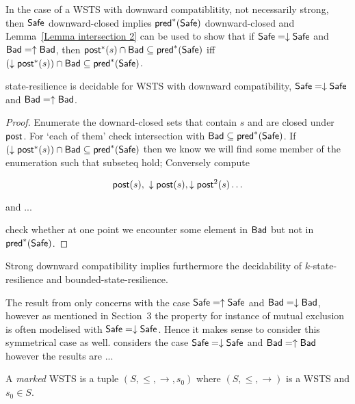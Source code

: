 In the case of a WSTS with downward compatiblitity, not necessarily strong,
then $\textsf{Safe}$ downward-closed implies $\textsf{pred}^*(\textsf{Safe})$ downward-closed and
Lemma~\ref{Lemma intersection 2} can be used to show that
if $\textsf{Safe} = \downarrow \textsf{Safe}$ and $\textsf{Bad} = \uparrow \textsf{Bad}$,
then
$\textsf{post}^*(s) \cap \textsf{Bad} \subseteq \textsf{pred}^*(\textsf{Safe})$  iff $ (\downarrow  \textsf{post}^*(s)) \cap \textsf{Bad} \subseteq \textsf{pred}^*(\textsf{Safe})$.


\begin{theorem}
{\sc state-resilience} is decidable for WSTS with downward compatibility,
$\textsf{Safe} = \downarrow \textsf{Safe}$ and $\textsf{Bad} = \uparrow \textsf{Bad}$.
\end{theorem}


\begin{proof}
Enumerate the downard-closed sets that contain $s$ and are closed under $\textsf{post}$.
For ‘each of them’
check
intersection with $\textsf{Bad} \subseteq \textsf{pred}^*(\textsf{Safe})$.
If $(\downarrow  \textsf{post}^*(s)) \cap \textsf{Bad} \subseteq \textsf{pred}^*(\textsf{Safe})$
then we know we will find some 
member of the enumeration such that
subseteq hold;
Conversely
compute

$$ \textsf{post}(s), ~ \downarrow \textsf{post}(s), \downarrow \textsf{post}^2(s) \ldots $$

and ...

check whether at one point we encounter some element in $\textsf{Bad}$ but not in $\textsf{pred}^*(\textsf{Safe})$.

\end{proof}


Strong downward compatibility implies furthermore the decidability
of $k$-state-resilience and bounded-state-resilience.



\iffalse	\mathieu{}

 The result from \cite{DBLP:journals/corr/abs-2108-00889}
only concerns with the case $\textsf{Safe} = \uparrow \textsf{Safe}$
and $\textsf{Bad} =\downarrow \textsf{Bad}$, 
 however as mentioned in Section~3
the property for instance of mutual exclusion is often modelised with $\textsf{Safe} = \downarrow \textsf{Safe}$.
Hence it makes sense to consider this symmetrical case as well. 
 \cite{DBLP:conf/gg/Ozkan22} considers 
 the case $\textsf{Safe} = \downarrow \textsf{Safe}$ and $\textsf{Bad} = \uparrow \textsf{Bad}$ however the results are ...


\begin{definition} 
A {\em marked} WSTS is a tuple $(S, \leq, \to, s_0)$
where $(S, \leq, \to)$ is a WSTS and $s_0 \in S$. 
\end{definition}

